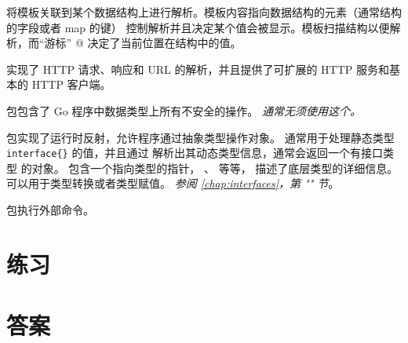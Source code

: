 \begin{description}
{将模板关联到某个数据结构上进行解析。模板内容指向数据结构的元素（通常结构的字段或者 map 的键）
控制解析并且决定某个值会被显示。模板扫描结构以便解析，而“游标” @ 决定了当前位置在结构中的值。
}
\item[\package{http}]{
 实现了 HTTP 请求、响应和 URL 的解析，并且提供了可扩展的 HTTP 服务和基本的 HTTP 客户端。
}
\item[\package{unsafe}]{
 包包含了 Go 程序中数据类型上所有不安全的操作。
\emph{通常无须使用这个。}
}
\item[\package{reflect}]{
 包实现了运行时反射，允许程序通过抽象类型操作对象。
通常用于处理静态类型 \lstinline|interface{}| 的值，并且通过 
解析出其动态类型信息，通常会返回一个有接口类型  的对象。
包含一个指向类型的指针， 、 等等，
描述了底层类型的详细信息。可以用于类型转换或者类型赋值。
\emph{参阅 \ref{chap:interfaces}，第 "" 节}。
}
\item[\package{exec}]{
 包执行外部命令。
}
\end{description}

\section{练习}





\cleardoublepage
\section{答案}
\shipoutAnswer
